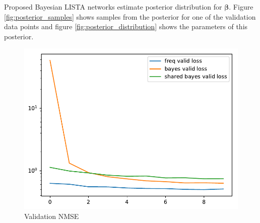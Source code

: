 \documentclass[letterpaper]{article}
\begin{document}
Proposed Bayesian LISTA networks estimate posterior distribution for $\boldsymbol\beta$. Figure \ref{fig:posterior_samples} shows samples from the posterior for one of the validation data points and figure \ref{fig:posterior_distribution} shows the parameters of this posterior.
\begin{figure}[t]
\includegraphics[width=\columnwidth]{loss}
\caption{Validation NMSE}
\label{fig:validation}
\end{figure}
\end{document}
